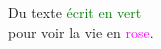 \documentclass[10pt,a4paper]{article}
\begin{document}
Du texte  \textcolor{green}{écrit en vert} \\
pour voir la vie en \textcolor{magenta}{rose}.
\end{document}
